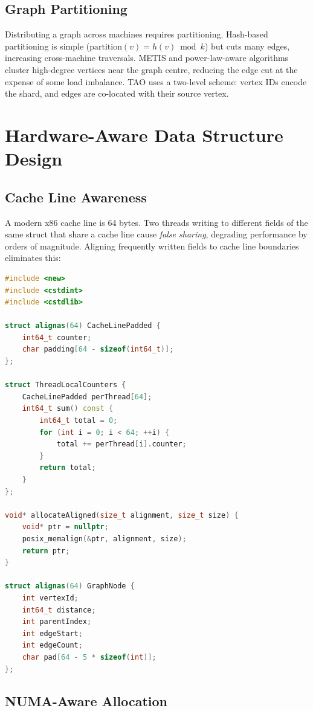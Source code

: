 \subsection{Graph Partitioning}

Distributing a graph across machines requires partitioning.  Hash-based partitioning
is simple ($\text{partition}(v) = h(v) \bmod k$) but cuts many edges, increasing
cross-machine traversals.  METIS and power-law-aware algorithms cluster high-degree
vertices near the graph centre, reducing the edge cut at the expense of some load
imbalance.  TAO uses a two-level scheme: vertex IDs encode the shard, and edges are
co-located with their source vertex.

\section{Hardware-Aware Data Structure Design}

\subsection{Cache Line Awareness}

A modern x86 cache line is 64 bytes.  Two threads writing to different fields of
the same struct that share a cache line cause \emph{false sharing}, degrading
performance by orders of magnitude.  Aligning frequently written fields to cache
line boundaries eliminates this:

\begin{lstlisting}[language=C++]
#include <new>
#include <cstdint>
#include <cstdlib>

struct alignas(64) CacheLinePadded {
    int64_t counter;
    char padding[64 - sizeof(int64_t)];
};

struct ThreadLocalCounters {
    CacheLinePadded perThread[64];
    int64_t sum() const {
        int64_t total = 0;
        for (int i = 0; i < 64; ++i) {
            total += perThread[i].counter;
        }
        return total;
    }
};

void* allocateAligned(size_t alignment, size_t size) {
    void* ptr = nullptr;
    posix_memalign(&ptr, alignment, size);
    return ptr;
}

struct alignas(64) GraphNode {
    int vertexId;
    int64_t distance;
    int parentIndex;
    int edgeStart;
    int edgeCount;
    char pad[64 - 5 * sizeof(int)];
};
\end{lstlisting}

\subsection{NUMA-Aware Allocation}


